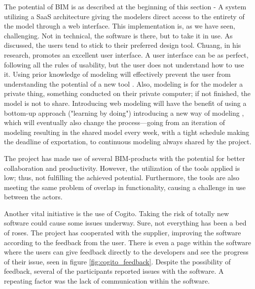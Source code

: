 The potential of BIM is as described at the beginning of this section - A system utilizing a SaaS architecture giving the modelers direct access to the entirety of the model through a web interface. This implementation is, as we have seen, challenging. Not in technical, the software is there, but to take it in use. As discussed, the users tend to stick to their preferred design tool. Chuang, in his research, promotes an excellent user interface. A user interface can be as perfect, following all the rules of usability, but the user does not understand how to use it. Using prior knowledge of modeling will effectively prevent the user from understanding the potential of a new tool \citep{orlikowski1992learning}. Also, modeling is for the modeler a private thing, something conducted on their private computer; if not finished, the model is not to share. Introducing web modeling will have the benefit of using a bottom-up approach ("learning by doing") introducing a new way of modeling \citep{aziz2013applying}, which will eventually also change the process—going from an iteration of modeling resulting in the shared model every week, with a tight schedule making the deadline of exportation, to continuous modeling always shared by the project.

The project has made use of several BIM-products with the potential for better collaboration and productivity. However, the utilization of the tools applied is low; thus, not fulfilling the achieved potential. Furthermore, the tools are also meeting the same problem of overlap in functionality, causing a challenge in use between the actors.

Another vital initiative is the use of Cogito. Taking the risk of totally new software could cause some issues underway. Sure, not everything has been a bed of roses. The project has cooperated with the supplier, improving the software according to the feedback from the user. There is even a page within the software where the users can give feedback directly to the developers and see the progress of their issue, seen in figure \ref{fig:cogito_feedback}. Despite the possibility of feedback, several of the participants reported issues with the software. A repeating factor was the lack of communication within the software. 

